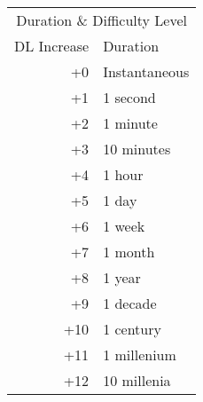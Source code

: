 \begin{tabularx}{\marginparwidth}{rX}
\multicolumn{2}{c}{Duration \& Difficulty Level} \\
DL Increase & Duration \\
\hline
+0 & Instantaneous \\
+1 & 1 second \\
+2 & 1 minute \\
+3 & 10 minutes \\
+4 & 1 hour \\
+5 & 1 day \\
+6 & 1 week \\
+7 & 1 month \\
+8 & 1 year \\
+9 & 1 decade \\
+10 & 1 century \\
+11 & 1 millenium \\
+12 & 10 millenia \\
\end{tabularx}